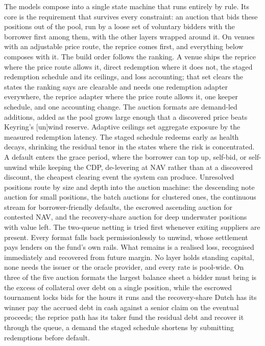 \documentclass[11pt,a4paper]{article}
\begin{document}
The models compose into a single state machine that runs entirely by rule. Its core is the requirement that survives every constraint: an auction that bids these positions out of the pool, run by a loose set of voluntary bidders with the borrower first among them, with the other layers wrapped around it. On venues with an adjustable price route, the reprice comes first, and everything below composes with it. The build order follows the ranking. A venue ships the reprice where the price route allows it, direct redemption where it does not, the staged redemption schedule and its ceilings, and loss accounting; that set clears the states the ranking says are clearable and needs one redemption adapter everywhere, the reprice adapter where the price route allows it, one keeper schedule, and one accounting change. The auction formats are demand-led additions, added as the pool grows large enough that a discovered price beats Keyring's [un]wind reserve. Adaptive ceilings set aggregate exposure by the measured redemption latency. The staged schedule redeems early as health decays, shrinking the residual tenor in the states where the risk is concentrated. A default enters the grace period, where the borrower can top up, self-bid, or self-unwind while keeping the CDP, de-levering at NAV rather than at a discovered discount, the cheapest clearing event the system can produce. Unresolved positions route by size and depth into the auction machine: the descending note auction for small positions, the batch auctions for clustered ones, the continuous stream for borrower-friendly defaults, the escrowed ascending auction for contested NAV, and the recovery-share auction for deep underwater positions with value left. The two-queue netting is tried first whenever exiting suppliers are present. Every format falls back permissionlessly to unwind, whose settlement pays lenders on the fund's own rails. What remains is a realised loss, recognised immediately and recovered from future margin. No layer holds standing capital, none needs the issuer or the oracle provider, and every rate is pool-wide. On three of the five auction formats the largest balance sheet a bidder must bring is the excess of collateral over debt on a single position, while the escrowed tournament locks bids for the hours it runs and the recovery-share Dutch has its winner pay the accrued debt in cash against a senior claim on the eventual proceeds; the reprice path has its taker fund the residual debt and recover it through the queue, a demand the staged schedule shortens by submitting redemptions before default.
\end{document}
